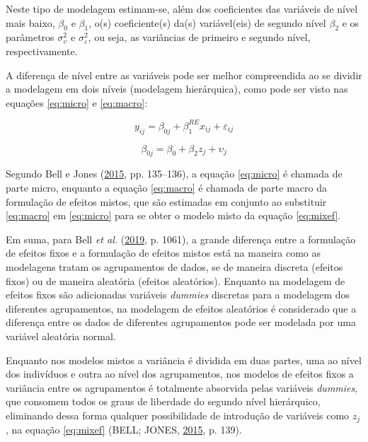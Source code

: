 \documentclass[
  a4paper, 11pt]{article}
\begin{document}
Neste tipo de modelagem estimam-se, além dos coeficientes das variáveis
de nível mais baixo, \(\beta_0\) e \(\beta_1\), o(s) coeficiente(s)
da(s) variável(eis) de segundo nível \(\beta_2\) e os parâmetros
\(\sigma_\upsilon^2\) e \(\sigma_\varepsilon^2\), ou seja, as variâncias
de primeiro e segundo nível, respectivamente.

A diferença de nível entre as variáveis pode ser melhor compreendida ao
se dividir a modelagem em dois níveis (modelagem hierárquica), como pode
ser visto nas equações \ref{eq:micro} e \ref{eq:macro}:

\begin{equation} \label{eq:micro}
y_{ij} = \beta_{0j} + \beta_1^{RE} x_{ij} + \varepsilon_{ij} 
\end{equation}

\begin{equation} \label{eq:macro}
\beta_{0j} = \beta_0 + \beta_2 z_{j} + \upsilon_{j} 
\end{equation}

Segundo Bell e Jones (\protect\hyperlink{ref-bell2015}{2015}, pp.
135--136), a equação \ref{eq:micro} é chamada de parte micro, enquanto a
equação \ref{eq:macro} é chamada de parte macro da formulação de efeitos
mistos, que são estimadas em conjunto ao substituir \ref{eq:macro} em
\ref{eq:micro} para se obter o modelo misto da equação \ref{eq:mixef}.

Em suma, para Bell \emph{et al.}
(\protect\hyperlink{ref-bell2019}{2019}, p. 1061), a grande diferença
entre a formulação de efeitos fixos e a formulação de efeitos mistos
está na maneira como as modelagens tratam os agrupamentos de dados, se
de maneira discreta (efeitos fixos) ou de maneira aleatória (efeitos
aleatórios). Enquanto na modelagem de efeitos fixos são adicionadas
variáveis \emph{dummies} discretas para a modelagem dos diferentes
agrupamentos, na modelagem de efeitos aleatórios é considerado que a
diferença entre os dados de diferentes agrupamentos pode ser modelada
por uma variável aleatória normal.

Enquanto nos modelos mistos a variância é dividida em duas partes, uma
ao nível dos indivíduos e outra ao nível dos agrupamentos, nos modelos
de efeitos fixos a variância entre os agrupamentos é totalmente
absorvida pelas variáveis \emph{dummies}, que consomem todos os graus de
liberdade do segundo nível hierárquico, eliminando dessa forma qualquer
possibilidade de introdução de variáveis como \(z_j\), na equação
\ref{eq:mixef} (BELL; JONES, \protect\hyperlink{ref-bell2015}{2015}, p.
139).
\end{document}

